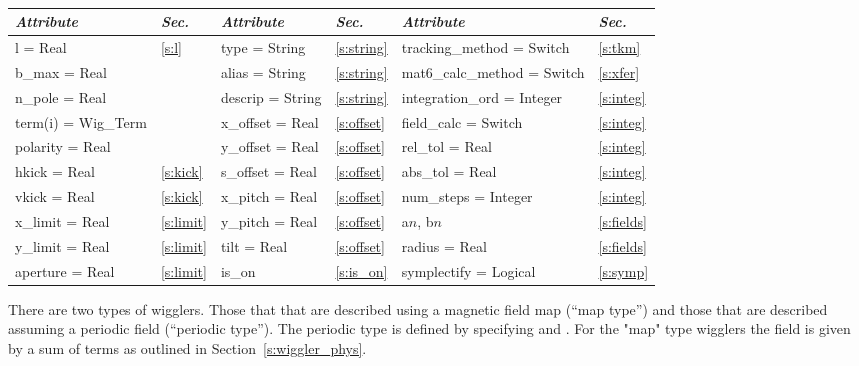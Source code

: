 \toffset
\begin{center}
\tt
\begin{tabular}{|l|l||l|l||l|l|} \hline
  {\sl Attribute} & {\sl Sec.}  & {\sl Attribute} & {\sl Sec.} & {\sl Attribute} & {\sl Sec.} \\ \hline
  l        = Real       & \ref{s:l}      & type = String      & \ref{s:string} & tracking\_method = Switch   & \ref{s:tkm}   \\ \hline
  b\_max   = Real       &                & alias = String     & \ref{s:string} & mat6\_calc\_method = Switch & \ref{s:xfer}  \\ \hline
  n\_pole  = Real       &                & descrip = String   & \ref{s:string} & integration\_ord = Integer  & \ref{s:integ} \\ \hline
  term(i) = Wig\_Term   &                & x\_offset  = Real  & \ref{s:offset} & field\_calc = Switch        & \ref{s:integ} \\ \hline
  polarity = Real       &                & y\_offset  = Real  & \ref{s:offset} & rel\_tol = Real             & \ref{s:integ} \\ \hline
  hkick    = Real       & \ref{s:kick}   & s\_offset  = Real  & \ref{s:offset} & abs\_tol = Real             & \ref{s:integ} \\ \hline
  vkick    = Real       & \ref{s:kick}   & x\_pitch = Real    & \ref{s:offset} & num\_steps = Integer        & \ref{s:integ} \\ \hline
  x\_limit = Real       & \ref{s:limit}  & y\_pitch = Real    & \ref{s:offset} & a$n$, b$n$                  & \ref{s:fields}\\ \hline
  y\_limit = Real       & \ref{s:limit}  & tilt     = Real    & \ref{s:offset} & radius  = Real              & \ref{s:fields}\\ \hline
  aperture = Real       & \ref{s:limit}  & is\_on             & \ref{s:is_on}  & symplectify = Logical       & \ref{s:symp}  \\ \hline
\end{tabular}
\end{center}
\toffset

There are two types of wigglers. Those that that are described using a
magnetic field map (``map type'') and those that are described assuming a periodic
field (``periodic type''). The periodic type is defined by specifying 
 and . For the "map" type wigglers the field is given 
by a sum of terms as outlined in Section~\ref{s:wiggler_phys}.

